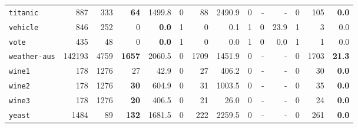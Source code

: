 \begin{tabular}{lccrrrrrrrrrrr}
\texttt{titanic} & \multicolumn{1}{r}{887} & \multicolumn{1}{r}{333}  & \textbf{64} & 1499.8 & 0 & 88 & 2490.9 & 0 & - & - & 0 & 105 & \textbf{0.0}\\
\texttt{vehicle} & \multicolumn{1}{r}{846} & \multicolumn{1}{r}{252}  & 0 & \textbf{0.0} & 1 & 0 & 0.1 & 1 & 0 & 23.9 & 1 & 3 & 0.0\\
\texttt{vote} & \multicolumn{1}{r}{435} & \multicolumn{1}{r}{48}  & 0 & \textbf{0.0} & 1 & 0 & 0.0 & 1 & 0 & 0.0 & 1 & 1 & 0.0\\
\texttt{weather-aus} & \multicolumn{1}{r}{142193} & \multicolumn{1}{r}{4759}  & \textbf{1657} & 2060.5 & 0 & 1709 & 1451.9 & 0 & - & - & 0 & 1703 & \textbf{21.3}\\
\texttt{wine1} & \multicolumn{1}{r}{178} & \multicolumn{1}{r}{1276}  & 27 & 42.9 & 0 & 27 & 406.2 & 0 & - & - & 0 & 30 & \textbf{0.0}\\
\texttt{wine2} & \multicolumn{1}{r}{178} & \multicolumn{1}{r}{1276}  & \textbf{30} & 604.9 & 0 & 31 & 1003.5 & 0 & - & - & 0 & 35 & \textbf{0.0}\\
\texttt{wine3} & \multicolumn{1}{r}{178} & \multicolumn{1}{r}{1276}  & \textbf{20} & 406.5 & 0 & 21 & 26.0 & 0 & - & - & 0 & 24 & \textbf{0.0}\\
\texttt{yeast} & \multicolumn{1}{r}{1484} & \multicolumn{1}{r}{89}  & \textbf{132} & 1681.5 & 0 & 222 & 2259.5 & 0 & - & - & 0 & 261 & \textbf{0.0}\\
\bottomrule
\end{tabular}
